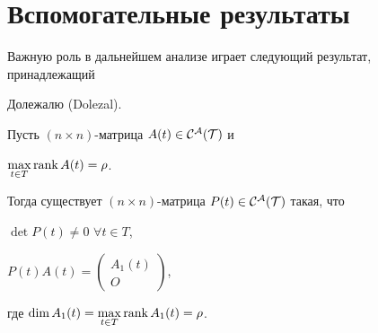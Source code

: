 \section{Вспомогательные результаты}





Важную роль в дальнейшем анализе играет следующий результат, принадлежащий


Долежалю (Dolezal).





\begin{lem}


Пусть $(n \times n)$-матрица $A(t) \in \cal C^A(T)$ и


$\max\limits_{t\in T}\operatorname{rank} A(t) = \rho$.





Тогда существует $(n \times n)$-матрица $P(t) \in \cal C^A(T)$ такая, что


$\det P(t) \ne 0$ \; $\forall t \in T$,


$P(t)A(t)= \left(\begin{smallmatrix}  A_1(t)\\  O


\end{smallmatrix} \right)$,


где $\dim A_1(t)=\max\limits_{t \in T}\operatorname{rank} A_1(t)= \rho$.


\end{lem}





